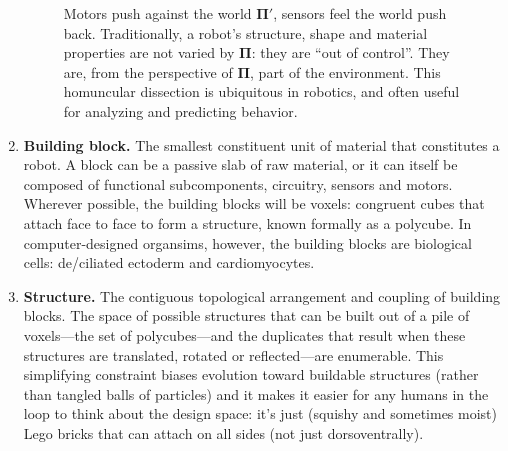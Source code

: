 \begin{enumerate}
\begin{figure}[H]
\begin{minipage}[t]{0.47\linewidth}
{        Motors push against the world $\mathbf{\Pi'}$, sensors feel the world push back.
        Traditionally, a robot's structure, shape and material properties are not varied by $\mathbf{\Pi}$: they are ``out of control''.
        They are, from the perspective of $\mathbf{\Pi}$, part of the environment.
        This homuncular dissection is ubiquitous in robotics, and often useful for analyzing and predicting behavior.
        }
    \end{minipage}
    \end{figure}
    
    \item \textbf{Building block.} 
    The smallest constituent unit of material that constitutes a robot.
    A block can be a passive slab of raw material,
    or it can itself be composed
    of functional subcomponents, circuitry, sensors and motors.
    Wherever possible, the building blocks will be voxels: congruent cubes that attach face to face to form a structure, known formally as a polycube.
    In computer-designed organsims, however, the building blocks are biological cells: de/ciliated ectoderm and cardiomyocytes.
    
    
    \item \textbf{Structure.} The contiguous topological arrangement and coupling of building blocks.
    The space of possible structures that can be built out of a pile of voxels---the set of polycubes---and the duplicates that result when these structures are translated, rotated or reflected---are enumerable.
    This simplifying constraint biases evolution toward buildable structures (rather than tangled balls of particles) and it makes it easier for any humans in the loop to think about the design space: it's just (squishy and sometimes moist) Lego bricks that can attach on all sides (not just dorsoventrally).
    

\end{enumerate}
